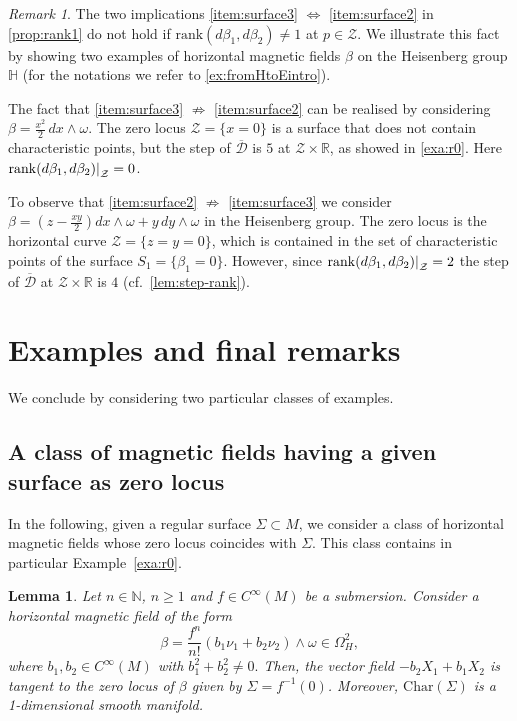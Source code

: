 \documentclass{amsart}
\theoremstyle{plain}
\newtheorem{lemma}[theorem]{Lemma}
\theoremstyle{definition}
\theoremstyle{remark}
\newtheorem{remark}[thm]{Remark}
\newcommand{\red}{\color{red}}
\newcommand{\R}{\mathbb{R}}
\newcommand{\diff}{d}%
\newcommand{\distr}{\mathcal{D}}								%
\newcommand{\B}{\beta}
\newcommand{\lift}[1]{\overline{#1}} 							%
\newcommand\restr[2]{{													%
  \left.\kern-\nulldelimiterspace 					
  #1 																			
  \right|_{#2} 														
  }}
\begin{document}
\begin{remark}
The two implications \ref{item:surface3} $\Leftrightarrow $  \ref{item:surface2} in \cref{prop:rank1} do not hold if ${\mathrm{rank}\left(\diff\B_1,\diff\B_2\right)}\neq 1$ at $p\in \mathcal{Z}$. We illustrate this fact by showing two examples of horizontal magnetic fields $\B$ on the Heisenberg group $\mathbb{H}$ (for the notations we refer to \cref{ex:fromHtoEintro}).

The fact that \ref{item:surface3} $\not \Rightarrow $  \ref{item:surface2} can be realised by considering 
$\B=\frac{x^2}{2}\,dx\wedge\omega$.
The zero locus $\mathcal{Z}=\{x=0\}$ is a surface that does not contain characteristic points, but the step of ${\lift\distr}$ is $5$ at ${\mathcal{Z}\times \R}$, as showed in \cref{exa:r0}.
Here $\mathrm{rank} \restr{\left(\diff\B_1,\diff\B_2\right)}{\mathcal{Z}}=0$.


To observe that \ref{item:surface2} $\not \Rightarrow $  \ref{item:surface3} we consider
$\B=\left(z-\frac{xy}{2}\right)dx\wedge\omega + y\,dy\wedge\omega$ in the Heisenberg group.
The zero locus is the horizontal curve $\mathcal{Z}=\{z=y=0\}$, which is contained in the set of characteristic points of the surface $S_1=\{\B_1=0\}$.
However, since $\mathrm{rank} \restr{\left(\diff\B_1,\diff\B_2\right)}{\mathcal{Z}}=2$ the step of $\lift \distr$ at $\mathcal{Z}\times \R$ is $4$ (cf.\ \cref{lem:step-rank}).
\end{remark}

\section{Examples and final remarks}
\label{s:examples}
We conclude by considering two particular classes of examples.
\subsection{A class of magnetic fields having a given surface as zero locus} 
In the following, given a regular surface $\Sigma\subset M$, we consider a class of horizontal magnetic fields whose zero locus coincides with $\Sigma$.  This class contains in particular Example~\ref{exa:r0}.

\begin{lemma}
\label{lem:example}
Let $n\in\mathbb{N}$, $n\geq 1$ and $f\in C^{\infty}(M)$ be a submersion. Consider a horizontal magnetic field of the form
\begin{equation}
\B=\frac{f^n}{n!}(b_1\nu_1+b_2\nu_2)\wedge\omega\in \Omega^2_H,
\end{equation}
where $b_1,b_2\in C^\infty(M)$ with  $b_1^2+b_2^2 \neq 0.$
Then, the vector field $-b_2X_1+b_1X_2$ is tangent to the zero locus of $\B$ given by $\Sigma=f^{-1}(0)$.
Moreover, $\mathrm{Char}(\Sigma)$ is a 1-dimensional smooth manifold.
\end{lemma}
\end{document}
